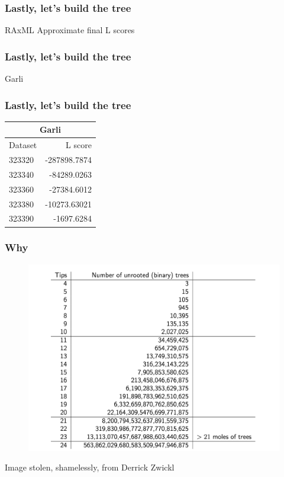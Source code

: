 \documentclass{beamer}
\begin{document}
\begin{frame}
\frametitle{Lastly, let's build the tree}
RAxML Approximate final L scores

\end{frame}

\begin{frame}
\frametitle{Lastly, let's build the tree}
Garli
\end{frame}

\begin{frame}
\frametitle{Lastly, let's build the tree}
\begin{center}
\begin{tabular}{ l  | r }
  \multicolumn{2}{c}{Garli} \\
\hline
    Dataset & L score  \\
\hline
  323320 & -287898.7874  \\
  323340 & -84289.0263 \\
  323360 & -27384.6012\\
  323380 & -10273.63021\\
  323390 & -1697.6284\\
\end{tabular}
\end{center}
\end{frame}

\begin{frame}
\frametitle{Why}
\begin{figure}
    \includegraphics[scale=0.35]{muchotrees}
    \end{figure}
\centerline{Image stolen, shamelessly, from Derrick Zwickl}
\end{frame}
\end{document}
